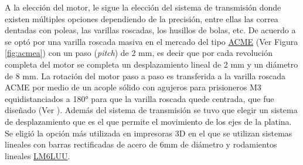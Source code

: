 A la elección del motor, le sigue la elección del sistema de transmisión donde existen múltiples opciones dependiendo de la precisión, entre ellas las correa dentadas con poleas, las varillas roscadas, los husillos de bolas, etc. De acuerdo a \cite{schaa} se optó por una varilla roscada masiva en el mercado del tipo \href{https://www.mcmaster.com/acme-screws/acme-lead-screws-and-nuts/}{ACME} (Ver Figura \ref{fig:acmea}) con un paso (\textit{pitch}) de 2 mm, es decir que por cada revolución completa del motor se completa un desplazamiento lineal de 2 mm y un diámetro de 8 mm. La rotación del motor paso a paso es transferida a la varilla roscada ACME por medio de un acople sólido con agujeros para prisioneros M3 equidistanciados a 180° para que la varilla roscada quede centrada, que fue diseñado (Ver \href{https://github.com/jrr1984/open_frame_XYStage/blob/master/3dprintedparts/STLs/acopleRIGIDO.STL}{\faCubes}). Además del sistema de transmisión se tuvo que elegir un sistema de desplazamiento que es el que permite el movimiento de los ejes de la platina. Se eligió la opción más utilizada en impresoras 3D en el que se utilizan sistemas lineales con barras rectificadas de acero de 6mm de diámetro y rodamientos lineales \href{https://uk.misumi-ec.com/vona2/detail/221000091678/?HissuCode=LM6LUU}{LM6LUU}.

\begin{figure}[H]
	\begin{floatrow}
	\end{floatrow}
\end{figure}

